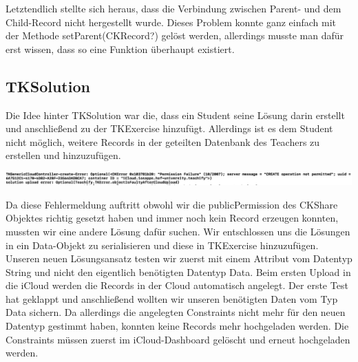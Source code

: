 Letztendlich stellte sich heraus, dass die Verbindung zwischen Parent- und dem Child-Record nicht hergestellt wurde. Dieses Problem konnte ganz einfach mit der Methode setParent(CKRecord?) gelöst werden, allerdings musste man dafür erst wissen, dass so eine Funktion überhaupt existiert.

\newpage

\subsection{TKSolution}

Die Idee hinter TKSolution war die, dass ein Student seine Lösung darin erstellt und anschließend zu der TKExercise hinzufügt. Allerdings ist es dem Student nicht möglich, weitere Records in der geteilten Datenbank des Teachers zu erstellen und hinzuzufügen.

\begin{center}
   \includegraphics[width=15cm]{images/code_error.pdf}
\end{center}

Da diese Fehlermeldung auftritt obwohl wir die publicPermission des CKShare Objektes richtig gesetzt haben und immer noch kein Record erzeugen konnten, mussten wir eine andere Lösung dafür suchen. Wir entschlossen uns die Lösungen in ein Data-Objekt zu serialisieren und diese in TKExercise hinzuzufügen. 
Unseren neuen Lösungsansatz testen wir zuerst mit einem Attribut vom Datentyp String und nicht den eigentlich benötigten Datentyp Data. Beim ersten Upload in die iCloud werden die Records in der Cloud automatisch angelegt. Der erste Test hat geklappt und anschließend wollten wir unseren benötigten Daten vom Typ Data sichern. Da allerdings die angelegten Constraints nicht mehr für den neuen Datentyp gestimmt haben, konnten keine Records mehr hochgeladen werden. Die Constraints müssen zuerst im iCloud-Dashboard gelöscht und erneut hochgeladen werden.

